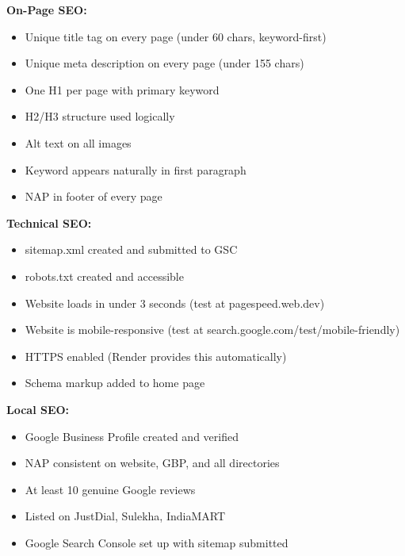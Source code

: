 \documentclass[12pt, a4paper]{book}
\begin{document}
\begin{tcolorbox}[notebox, title={✅ SEO Checklist}]
\textbf{On-Page SEO:}
\begin{itemize}[label=\(\square\)]
  \item Unique title tag on every page (under 60 chars, keyword-first)
  \item Unique meta description on every page (under 155 chars)
  \item One H1 per page with primary keyword
  \item H2/H3 structure used logically
  \item Alt text on all images
  \item Keyword appears naturally in first paragraph
  \item NAP in footer of every page
\end{itemize}

\textbf{Technical SEO:}
\begin{itemize}[label=\(\square\)]
  \item sitemap.xml created and submitted to GSC
  \item robots.txt created and accessible
  \item Website loads in under 3 seconds (test at pagespeed.web.dev)
  \item Website is mobile-responsive (test at search.google.com/test/mobile-friendly)
  \item HTTPS enabled (Render provides this automatically)
  \item Schema markup added to home page
\end{itemize}

\textbf{Local SEO:}
\begin{itemize}[label=\(\square\)]
  \item Google Business Profile created and verified
  \item NAP consistent on website, GBP, and all directories
  \item At least 10 genuine Google reviews
  \item Listed on JustDial, Sulekha, IndiaMART
  \item Google Search Console set up with sitemap submitted
\end{itemize}
\end{tcolorbox}
\end{document}

